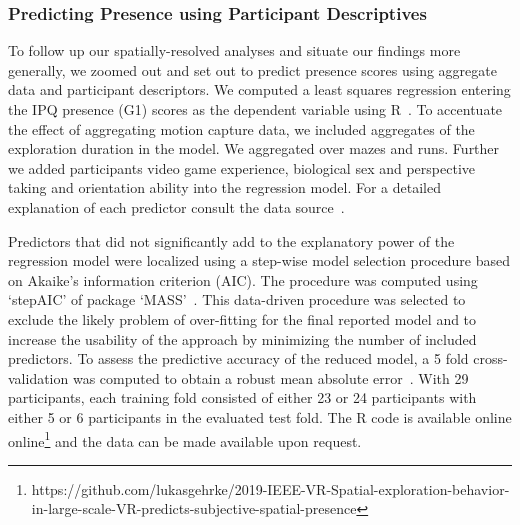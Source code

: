\subsubsection{Predicting Presence using Participant Descriptives} 
To follow up our spatially-resolved analyses and situate our findings more generally, we zoomed out and set out to predict presence scores using aggregate data and participant descriptors. We computed a least squares regression entering the IPQ presence (G1) scores as the dependent variable using R~\cite{RFoundationforStatisticalComputing.2018}. To accentuate the effect of aggregating motion capture data, we included aggregates of the exploration duration in the model. We aggregated over mazes and runs. Further we added participants video game experience, biological sex and perspective taking and orientation ability into the regression model. For a detailed explanation of each predictor consult the data source~\cite{Gehrke2018}. 

Predictors that did not significantly add to the explanatory power of the regression model were localized using a step-wise model selection procedure based on Akaike's information criterion (AIC). The procedure was computed using `stepAIC' of package `MASS'~\cite{Akaike1998a, Venables2002}. This data-driven procedure was selected to exclude the likely problem of over-fitting for the final reported model and to increase the usability of the approach by minimizing the number of included predictors. To assess the predictive accuracy of the reduced model, a 5 fold cross-validation was computed to obtain a robust mean absolute error~\cite{Mosteller1968, Furnkranz2011}. With 29 participants, each training fold consisted of either 23 or 24 participants with either 5 or 6 participants in the evaluated test fold. The R code is available online online\footnote{https://github.com/lukasgehrke/2019-IEEE-VR-Spatial-exploration-behavior-in-large-scale-VR-predicts-subjective-spatial-presence} and the data can be made available upon request.

